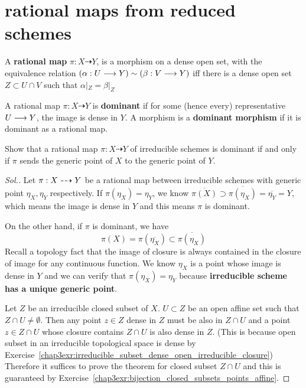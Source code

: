 \documentclass[11pt]{book} %
\begin{document}
\section{rational maps from reduced schemes}
\begin{definition}
A \textbf{rational map } $\pi:X\dashrightarrow Y$, is a morphism on a dense open set, with the equivalence relation $(\alpha:U\longrightarrow Y)\sim (\beta:V\longrightarrow Y)$ iff there is a dense open set $Z\subset U\cap V$ such that $\alpha|_Z=\beta|_Z$

A rational map $\pi:X\dashrightarrow Y$ is \textbf{dominant} if for some (hence every) representative $U\longrightarrow Y$, the image is dense in $Y$. A morphism is a \textbf{dominant morphism} if it is  dominant as a rational map.
\end{definition}
\begin{exr}\label{chap6exr:dominant_rational_map_generic_points}
Show that a rational map $\pi:X\dashrightarrow Y$ of irreducible schemes is dominant if and only if $\pi$ sends the generic point of $X$ to the generic point of $Y$.
\end{exr}
\begin{proof}[Sol.]
Let $\pi:X\dashrightarrow Y$ be a rational map between irreducible schemes with generic point $\eta_X,\eta_Y$ respectively. If $\pi(\eta_X)=\eta_Y$,  we know $\overline{\pi(X)}\supset \overline{\pi(\eta_X)}=\overline{\eta_Y}=Y$, which means the image is dense in $Y$ and this means $\pi$ is dominant.

On the other hand, if $\pi$ is dominant, we have
$$
\pi(X)=\pi(\overline{\eta_X})\subset \overline{\pi(\eta_X)}
$$
Recall a topology fact that the image of closure is always contained in the closure of image for any continuous function. We know $\eta_X$ is a point whose image is dense in $Y$ and we can verify that $\pi(\eta_X)=\eta_Y$ because \textbf{irreducible scheme has a unique generic point}.

Let $Z$ be an irreducible closed subset of $X$. $U\subset Z$ be an open affine set such that $Z\cap U\neq \emptyset$. Then any point $z\in Z$ dense in $Z$ must be also in $Z\cap U$ and a point $z\in Z\cap U$ whose closure contains $Z\cap U$ is also dense in $Z$. (This is because open subset in an irreducible topological space is dense by Exercise~\ref{chap3exr:irreducible_subset_dense_open_irreducible_closure}) Therefore it suffices to prove the theorem for closed subset $Z\cap U$ and this is guaranteed by Exercise~\ref{chap3exr:bijection_closed_subsets_points_affine}. 
\end{proof}
\end{document}
